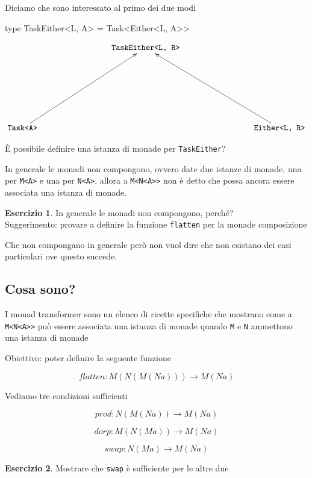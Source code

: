 \documentclass[12pt]{article}
\theoremstyle{definition}
\newtheorem{exercise}{Esercizio}[section]
\newenvironment{code}
  {\vspace{0.5cm} \VerbatimEnvironment\begin{typescriptcode}}
  {\end{typescriptcode} \vspace{0.2cm}}
\begin{document}
Diciamo che sono interessato al primo dei due modi

\begin{code}
type TaskEither<L, A> = Task<Either<L, A>>
\end{code}

\[
\xymatrixrowsep{3cm}
\xymatrixcolsep{3cm}
\xymatrix{
  & \texttt{TaskEither<L, R>} \\
  \texttt{Task<A>} \ar[ur] & & \texttt{Either<L, R>} \ar[ul] \\
}
\]

È possibile definire una istanza di monade per \texttt{TaskEither}?

In generale le monadi non compongono, ovvero date due istanze di monade, una per \texttt{M<A>} e una per \texttt{N<A>},
allora a \texttt{M<N<A>>} non è detto che possa ancora essere associata una istanza di monade.

\begin{exercise}
In generale le monadi non compongono, perché? \\
Suggerimento: provare a definire la funzione \texttt{flatten} per la monade composizione
\end{exercise}

Che non compongano in generale però non vuol dire che non esistano dei casi particolari ove questo succede.

\subsection{Cosa sono?}

I monad transformer sono un elenco di ricette specifiche che mostrano come a \texttt{M<N<A>>} può essere associata una istanza di monade
quando \texttt{M} e \texttt{N} ammettono una istanza di monade

Obiettivo: poter definire la seguente funzione

$$
flatten: M ( N ( M ( N a ) ) ) \rightarrow M ( N a )
$$

Vediamo tre condizioni sufficienti

$$
prod: N (M ( N a ) ) \rightarrow M( N a )
$$

$$
dorp: M (N ( M a ) ) \rightarrow M ( N a )
$$

$$
swap: N ( M a ) \rightarrow M ( N a )
$$

\begin{exercise}
Mostrare che \texttt{swap} è sufficiente per le altre due
\end{exercise}
\end{document}
